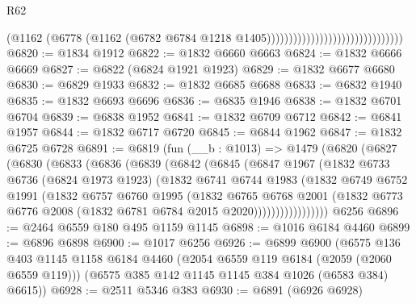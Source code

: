 \begin{lexlean}{R62}
\begin{coremodule}
                                                          (@1162
                                                            (@6778
                                                              (@1162
                                                                (@6782
                                                                  @6784
                                                                  @1218
                                                                  @1405)))))))))))))))))))))))))))))))
@6820 := @1834 @1912
@6822 := @1832 @6660 @6663
@6824 := @1832 @6666 @6669
@6827 := @6822 (@6824 @1921 @1923)
@6829 := @1832 @6677 @6680
@6830 := @6829 @1933
@6832 := @1832 @6685 @6688
@6833 := @6832 @1940
@6835 := @1832 @6693 @6696
@6836 := @6835 @1946
@6838 := @1832 @6701 @6704
@6839 := @6838 @1952
@6841 := @1832 @6709 @6712
@6842 := @6841 @1957
@6844 := @1832 @6717 @6720
@6845 := @6844 @1962
@6847 := @1832 @6725 @6728
@6891 := @6819
    (fun (__b : @1013) =>
    @1479
      (@6820
        (@6827
          (@6830
            (@6833
              (@6836
                (@6839
                  (@6842
                    (@6845
                      (@6847
                        @1967
                        (@1832
                          @6733
                          @6736
                          (@6824 @1973 @1923)
                          (@1832
                            @6741
                            @6744
                            @1983
                            (@1832
                              @6749
                              @6752
                              @1991
                              (@1832
                                @6757
                                @6760
                                @1995
                                (@1832
                                  @6765
                                  @6768
                                  @2001
                                  (@1832
                                    @6773
                                    @6776
                                    @2008
                                    (@1832 @6781 @6784 @2015 @2020)))))))))))))))))
    @6256
@6896 := @2464 @6559 @180 @495 @1159 @1145
@6898 := @1016 @6184 @4460
@6899 := @6896 @6898
@6900 := @1017 @6256
@6926 := @6899
    @6900
    (@6575
      @136
      @403
      @1145
      @1158
      @6184
      @4460
      (@2054 @6559 @119 @6184 (@2059 (@2060 @6559 @119)))
      (@6575 @385 @142 @1145 @1145 @384 @1026 (@6583 @384) @6615))
@6928 := @2511 @5346 @383
@6930 := @6891 (@6926 @6928)

\end{coremodule}
\end{lexlean}
